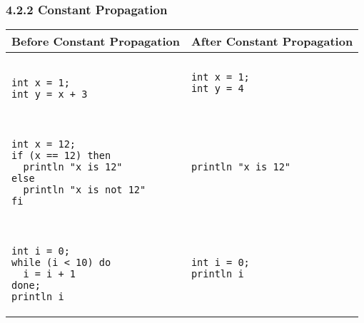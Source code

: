 \documentclass[10pt,a4paper,]{report}
\newenvironment{tabularverbatim}
 {\VerbatimEnvironment
  \begin{BVerbatim}[baseline=c,formatcom=\setlength{\baselineskip}{\normalbaselineskip}]}
 {\end{BVerbatim}}
\begin{document}
  \subsubsection*{4.2.2 Constant Propagation}
  \begin{center}
    \begin{tabular}{| m{5cm} | m{5cm} |}
      \hline
      Before Constant Propagation & After Constant Propagation \\
      \hline
      \begin{tabularverbatim}

int x = 1;
int y = x + 3

      \end{tabularverbatim}
       &
      \begin{tabularverbatim}
int x = 1; 
int y = 4
      \end{tabularverbatim}
      \\
      \hline
      \begin{tabularverbatim}
      
int x = 12;
if (x == 12) then
  println "x is 12"
else
  println "x is not 12"
fi

      \end{tabularverbatim}
      &
      \begin{tabularverbatim}
println "x is 12"
      \end{tabularverbatim}
      \\
      \hline
      \begin{tabularverbatim}

int i = 0;
while (i < 10) do
  i = i + 1
done;
println i

      \end{tabularverbatim}
      &
      \begin{tabularverbatim}
int i = 0;
println i
      \end{tabularverbatim}
      \\
      \hline
    \end{tabular}
  \end{center}
\end{document}
